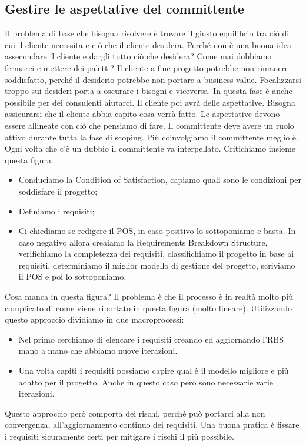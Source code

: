 \subsection{Gestire le aspettative del committente}
Il problema di base che bisogna risolvere è trovare il giusto equilibrio tra ciò di cui il cliente necessita e ciò che il cliente desidera. Perché non è una buona idea assecondare il cliente e dargli tutto ciò che desidera? Come mai dobbiamo fermarci e mettere dei paletti?\newline
Il cliente a fine progetto potrebbe non rimanere soddisfatto, perché il desiderio potrebbe non portare a business value. Focalizzarsi troppo sui desideri porta a oscurare i bisogni e viceversa. In questa fase è anche possibile per dei consulenti aiutarci. Il cliente poi avrà delle aspettative. Bisogna assicurarsi che il cliente abbia capito cosa verrà fatto. Le aspettative devono essere allineate con ciò che pensiamo di fare. Il committente deve avere un ruolo attivo durante tutta la fase di scoping. Più coinvolgiamo il committente meglio è. Ogni volta che c'è un dubbio il committente va interpellato.
Critichiamo insieme questa figura.
\begin{itemize}
	\item Conduciamo la Condition of Satisfaction, capiamo quali sono le condizioni per soddisfare il progetto;
	\item Definiamo i requisiti;
	\item Ci chiediamo se redigere il POS, in caso positivo lo sottoponiamo e basta. In caso negativo allora creaiamo la Requirements Breakdown Structure, verifichiamo la completezza dei requisiti, classifichiamo il progetto in base ai requisiti, determiniamo il miglior modello di gestione del progetto, scriviamo il POS e poi lo sottoponiamo.
\end{itemize}
Cosa manca in questa figura? Il problema è che il processo è in realtà molto più complicato di come viene riportato in questa figura (molto lineare).
Utilizzando questo approccio dividiamo in due macroprocessi:
\begin{itemize}
	\item Nel primo cerchiamo di elencare i requisiti creando ed aggiornando l'RBS mano a mano che abbiamo nuove iterazioni.
	\item Una volta capiti i requisiti possiamo capire qual è il modello migliore e più adatto per il progetto. Anche in questo caso però sono necessarie varie iterazioni.
\end{itemize}
Questo approccio però comporta dei rischi, perché può portarci alla non convergenza, all'aggiornamento continuo dei requisiti. Una buona pratica è fissare i requisiti sicuramente certi per mitigare i rischi il più possibile.
